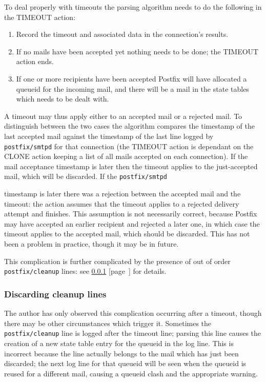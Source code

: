 \documentclass[a4paper,12pt,draft]{article}
\newcommand{\refwithpage}[1]{%
    \empty{}\ref{#1} [page~\pageref{#1}]%
}
\newcommand{\sectionref}[1]{%
    \textsection{}\refwithpage{#1}%
}
\newcommand{\daemon}[1]{%
    \texttt{postfix/#1}%
}
\begin{document}
To deal properly with timeouts the parsing algorithm needs to do the
following in the TIMEOUT action:

\begin{enumerate}

    \item Record the timeout and associated data in the connection's
        results.

    \item If no mails have been accepted yet nothing needs to be done; the
        TIMEOUT action ends.  

    \item If one or more recipients have been accepted Postfix will have
        allocated a queueid for the incoming mail, and there will be a mail
        in the state tables which needs to be dealt with.
        
\end{enumerate}

A timeout may thus apply either to an accepted mail or a rejected mail.  To
distinguish between the two cases the algorithm compares the timestamp of
the last accepted mail against the timestamp of the last line logged by
\daemon{smtpd} for that connection (the TIMEOUT action is dependant on the
CLONE action keeping a list of all mails accepted on each connection).  If
the mail acceptance timestamp is later then the timeout applies to the
just-accepted mail, which will be discarded.  If the \daemon{smtpd}
timestamp is later there was a rejection between the accepted mail and the
timeout: the action assumes that the timeout applies to a rejected delivery
attempt and finishes.  This assumption is not necessarily correct, because
Postfix may have accepted an earlier recipient and rejected a later one, in
which case the timeout applies to the accepted mail, which should be
discarded.  This has not been a problem in practice, though it may be in
future.

This complication is further complicated by the presence of out of order
\daemon{cleanup} lines: see \sectionref{discarding cleanup lines} for
details.

\subsubsection{Discarding cleanup lines}

\label{discarding cleanup lines}

The author has only observed this complication occurring after a timeout,
though there may be other circumstances which trigger it.  Sometimes the
\daemon{cleanup} line is logged after the timeout line; parsing this line
causes the creation of a new state table entry for the queueid in the log
line.  This is incorrect because the line actually belongs to the mail
which has just been discarded; the next log line for that queueid will be
seen when the queueid is reused for a different mail, causing a queueid
clash and the appropriate warning.
\end{document}
